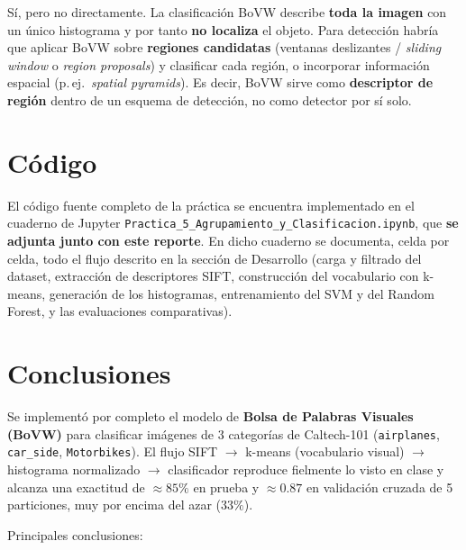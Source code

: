 \documentclass{article}
\begin{document}
\begin{enumerate}
\begin{itemize}
        Sí, pero no directamente. La clasificación BoVW describe \textbf{toda la imagen} con
        un único histograma y por tanto \textbf{no localiza} el objeto. Para detección habría
        que aplicar BoVW sobre \textbf{regiones candidatas} (ventanas deslizantes /
        \textit{sliding window} o \textit{region proposals}) y clasificar cada región, o
        incorporar información espacial (p.\,ej.\ \textit{spatial pyramids}). Es decir, BoVW
        sirve como \textbf{descriptor de región} dentro de un esquema de detección, no como
        detector por sí solo.
    \end{itemize}

\end{enumerate}

\bigskip


\section{Código}
El código fuente completo de la práctica se encuentra implementado en el cuaderno de Jupyter
\texttt{Practica\_5\_Agrupamiento\_y\_Clasificacion.ipynb}, que \textbf{se adjunta junto con
este reporte}. En dicho cuaderno se documenta, celda por celda, todo el flujo descrito en la
sección de Desarrollo (carga y filtrado del dataset, extracción de descriptores SIFT,
construcción del vocabulario con k-means, generación de los histogramas, entrenamiento del
SVM y del Random Forest, y las evaluaciones comparativas).

\section{Conclusiones}
Se implementó por completo el modelo de \textbf{Bolsa de Palabras Visuales (BoVW)} para
clasificar imágenes de 3 categorías de Caltech-101 (\texttt{airplanes}, \texttt{car\_side},
\texttt{Motorbikes}). El flujo SIFT $\rightarrow$ k-means (vocabulario visual)
$\rightarrow$ histograma normalizado $\rightarrow$ clasificador reproduce fielmente lo visto
en clase y alcanza una exactitud de $\approx 85\%$ en prueba y $\approx 0.87$ en validación
cruzada de 5 particiones, muy por encima del azar ($33\%$).

Principales conclusiones:
\end{document}
